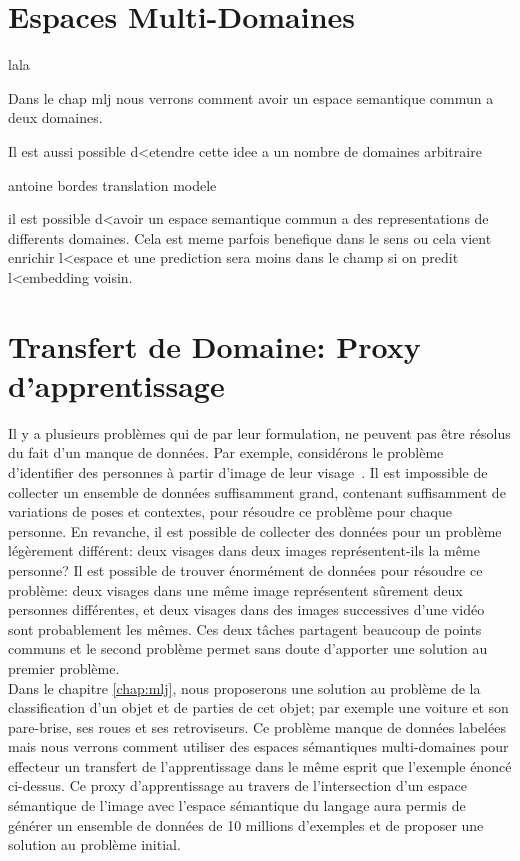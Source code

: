 \section{Espaces Multi-Domaines}

lala

Dans le chap mlj nous verrons comment avoir un espace semantique commun a deux domaines. 

Il est aussi possible d<etendre cette idee a un nombre de domaines arbitraire

antoine bordes translation modele

il est possible d<avoir un espace semantique commun a des representations de differents domaines. Cela est meme parfois benefique dans le sens ou cela vient enrichir l<espace et une prediction sera moins dans le champ si on predit l<embedding voisin.

\section{Transfert de Domaine: Proxy d'apprentissage}

Il y a plusieurs problèmes qui de par leur formulation, ne peuvent pas être
résolus du fait d'un manque de données. Par exemple, considérons le problème
d'identifier des personnes à partir d'image de leur visage~\citep{bottou-11}.
Il est impossible de collecter un ensemble de données suffisamment grand,
contenant suffisamment de variations de poses et contextes, pour résoudre ce
problème pour chaque personne. En revanche, il est possible de collecter des
données pour un problème légèrement différent: deux visages dans deux images
représentent-ils la même personne? Il est possible de trouver énormément de
données pour résoudre ce problème: deux visages dans une même image
représentent sûrement deux personnes différentes, et deux visages dans des
images successives d'une vidéo sont probablement les mêmes. Ces deux tâches
partagent beaucoup de points communs et le second problème permet sans doute
d'apporter une solution au premier problème. 
\\

Dans le chapitre \ref{chap:mlj}, nous proposerons une solution au problème de
la classification d'un objet et de parties de cet objet; par exemple une
voiture et son pare-brise, ses roues et ses retroviseurs. Ce problème manque de
données labelées mais nous verrons comment utiliser des espaces sémantiques
multi-domaines pour effecteur un transfert de l'apprentissage dans le même
esprit que l'exemple énoncé ci-dessus. Ce proxy d'apprentissage au travers de
l'intersection d'un espace sémantique de l'image avec l'espace sémantique du
langage aura permis de générer un ensemble de données de 10 millions d'exemples
et de proposer une solution au problème initial.

